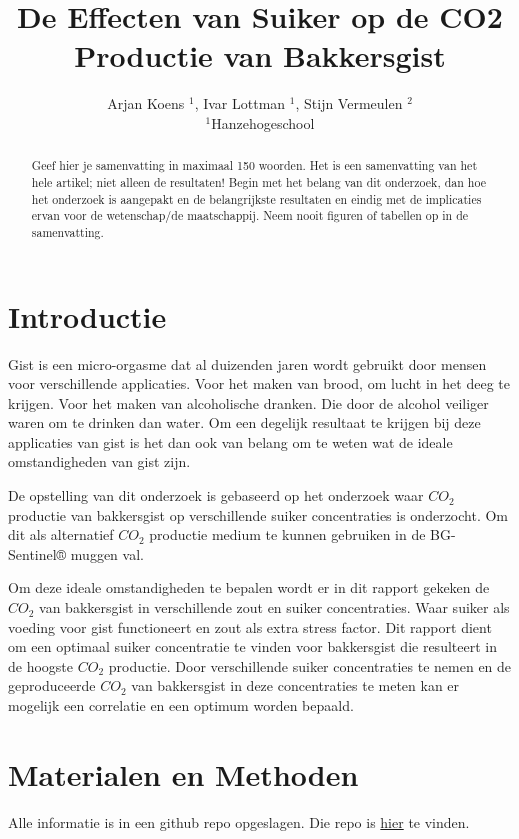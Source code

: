 \documentclass[
]{article}
\title{De Effecten van Suiker op de CO2 Productie van Bakkersgist}
\author{Arjan Koens \(^1\), Ivar Lottman \(^1\), Stijn Vermeulen \(^2\)\\
\(^1\)Hanzehogeschool}
\date{}
\begin{document}
\maketitle
\begin{abstract}
Geef hier je samenvatting in maximaal 150 woorden. Het is een samenvatting van het hele artikel; niet alleen de resultaten! Begin met het belang van dit onderzoek, dan hoe het onderzoek is aangepakt en de belangrijkste resultaten en eindig met de implicaties ervan voor de wetenschap/de maatschappij. Neem nooit figuren of tabellen op in de samenvatting.
\end{abstract}

\section{Introductie}\label{introductie}

Gist is een micro-orgasme dat al duizenden jaren wordt gebruikt door mensen voor verschillende applicaties. Voor het maken van brood, om lucht in het deeg te krijgen. Voor het maken van alcoholische dranken. Die door de alcohol veiliger waren om te drinken dan water. Om een degelijk resultaat te krijgen bij deze applicaties van gist is het dan ook van belang om te weten wat de ideale omstandigheden van gist zijn.

De opstelling van dit onderzoek is gebaseerd op het onderzoek \cite{Jerry2017} waar \(CO_2\) productie van bakkersgist op verschillende suiker concentraties is onderzocht. Om dit als alternatief \(CO_2\) productie medium te kunnen gebruiken in de BG-Sentinel® muggen val.

Om deze ideale omstandigheden te bepalen wordt er in dit rapport gekeken de \(CO_2\) van bakkersgist in verschillende zout en suiker concentraties. Waar suiker als voeding voor gist functioneert en zout als extra stress factor. Dit rapport dient om een optimaal suiker concentratie te vinden voor bakkersgist die resulteert in de hoogste \(CO_2\) productie. Door verschillende suiker concentraties te nemen en de geproduceerde \(CO_2\) van bakkersgist in deze concentraties te meten kan er mogelijk een correlatie en een optimum worden bepaald.

\section{Materialen en Methoden}\label{materialen-en-methoden}

Alle informatie is in een github repo opgeslagen. Die repo is \href{https://github.com/Akoens/ProjectWetenschappelijkeCyclus}{hier} te vinden.
\end{document}
